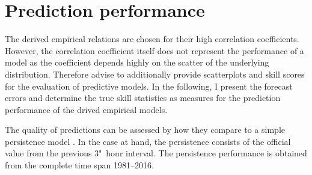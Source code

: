 \section{Prediction performance}
\label{sec:prediction_performance}
The derived empirical relations are chosen for their high correlation coefficients. However, the correlation coefficient itself does not represent the performance of a model as the coefficient depends highly on the scatter of the underlying distribution. Therefore \citet{Wing2005} advise to additionally provide scatterplots and skill scores for the evaluation of predictive models. In the following, I present the forecast errors and determine the true skill statistics as measures for the prediction performance of the drived empirical models.

The quality of predictions can be assessed by how they compare to a simple persistence model \citep{Detman1999}. In the case at hand, the persistence consists of the official \Kp{} value from the previous 3"~hour interval. The persistence performance is obtained from the complete \Kp{} time span 1981--2016.


